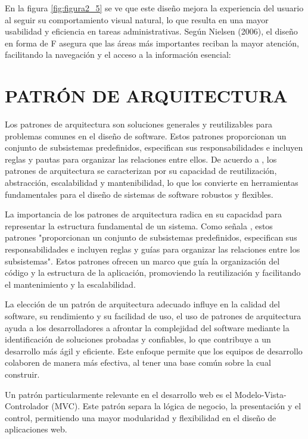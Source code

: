 		En la figura \ref{fig:figura2_5} se ve que este diseño mejora la experiencia del usuario al seguir su comportamiento visual natural, lo que resulta en una mayor usabilidad y eficiencia en tareas administrativas. Según Nielsen (2006), el diseño en forma de F asegura que las áreas más importantes reciban la mayor atención, facilitando la navegación y el acceso a la información esencial:
	
	\section{PATRÓN DE ARQUITECTURA}
		Los patrones de arquitectura son soluciones generales y reutilizables para problemas comunes en el diseño de software. Estos patrones proporcionan un conjunto de subsistemas predefinidos, especifican sus responsabilidades e incluyen reglas y pautas para organizar las relaciones entre ellos. De acuerdo a \textcite{cervantes2016arquitectura}, los patrones de arquitectura se caracterizan por su capacidad de reutilización, abstracción, escalabilidad y mantenibilidad, lo que los convierte en herramientas fundamentales para el diseño de sistemas de software robustos y flexibles.
		
		La importancia de los patrones de arquitectura radica en su capacidad para representar la estructura fundamental de un sistema. Como señala \textcite{pressman2010ingenieria}, estos patrones "proporcionan un conjunto de subsistemas predefinidos, especifican sus responsabilidades e incluyen reglas y guías para organizar las relaciones entre los subsistemas". Estos patrones ofrecen un marco que guía la organización del código y la estructura de la aplicación, promoviendo la reutilización y facilitando el mantenimiento y la escalabilidad.
		
		La elección de un patrón de arquitectura adecuado influye en la calidad del software, su rendimiento y su facilidad de uso, el uso de patrones de arquitectura ayuda a los desarrolladores a afrontar la complejidad del software mediante la identificación de soluciones probadas y confiables, lo que contribuye a un desarrollo más ágil y eficiente. Este enfoque permite que los equipos de desarrollo colaboren de manera más efectiva, al tener una base común sobre la cual construir.
		
		Un patrón particularmente relevante en el desarrollo web es el Modelo-Vista-Controlador (MVC). Este patrón separa la lógica de negocio, la presentación y el control, permitiendo una mayor modularidad y flexibilidad en el diseño de aplicaciones web. 
		
